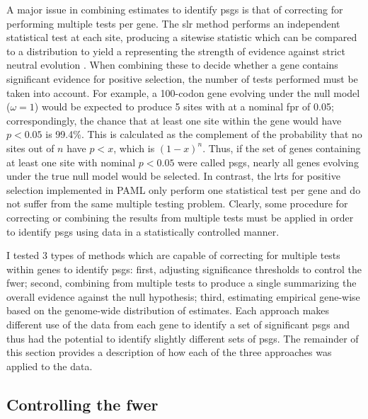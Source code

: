 A major issue in combining \sw estimates to identify \acp{psg} is that
of correcting for performing multiple \sw tests per gene. The \ac{slr}
method performs an independent statistical test at each site,
producing a sitewise statistic which can be compared to a \chisq
distribution to yield a \pv representing the strength of evidence
against strict neutral evolution \citep{Massingham2005}. When
combining these \pvs to decide whether a gene contains significant
evidence for positive selection, the number of tests performed must be
taken into account. For example, a 100-codon gene evolving under the
null model ($\omega=1$) would be expected to produce 5 sites with
\pvs at a nominal \ac{fpr} of 0.05; correspondingly, the chance
that at least one site within the gene would have $p<0.05$ is
99.4\%. This is calculated as the complement of the probability that
no sites out of $n$ have $p<x$, which is $(1-x)^{n}$. Thus, if the set
of genes containing at least one site with nominal $p<0.05$ were
called \acp{psg}, nearly all genes evolving under the true null model
would be selected. In contrast, the \ac{lrt}s for positive selection
implemented in PAML only perform one statistical test per gene and do
not suffer from the same multiple testing problem. Clearly, some
procedure for correcting or combining the results from multiple tests
must be applied in order to identify \acp{psg} using \sw data in a
statistically controlled manner.

I tested 3 types of methods which are capable of correcting for
multiple \sw tests within genes to identify \acp{psg}: first,
adjusting significance thresholds to control the \ac{fwer}; second,
combining \pvs from multiple tests to produce a single \pv
summarizing the overall evidence against the null hypothesis; third,
estimating empirical gene-wise \pvs based on the genome-wide
distribution of \sw estimates. Each approach makes different use of
the \sw data from each gene to identify a set of significant \acp{psg}
and thus had the potential to identify slightly different sets of
\acp{psg}. The remainder of this section provides a description of how
each of the three approaches was applied to the \sw data.

\subsection{Controlling the \ac{fwer}}

